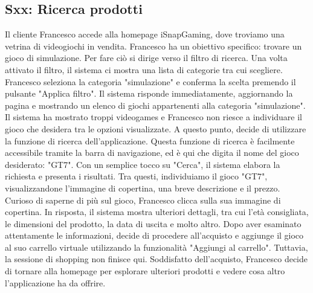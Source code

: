 \documentclass[12pt, a4paper, oneside]{book}
\begin{document}
    \subsection*{Sxx: Ricerca prodotti}

    Il cliente Francesco accede alla homepage iSnapGaming, dove troviamo una vetrina di videogiochi in vendita.
    Francesco ha un obiettivo specifico: trovare un gioco di simulazione. Per fare ciò si dirige verso il filtro di
    ricerca. Una volta attivato il filtro, il sistema ci mostra una lista di categorie tra cui scegliere. Francesco
    seleziona la categoria "simulazione" e conferma la scelta premendo il pulsante "Applica filtro". Il sistema risponde
    immediatamente, aggiornando la pagina e mostrando un elenco di giochi appartenenti alla categoria "simulazione".
    Il sistema ha mostrato troppi videogames e Francesco non riesce a individuare il gioco che desidera tra le opzioni
    visualizzate. A questo punto, decide di utilizzare la funzione di ricerca dell'applicazione. Questa funzione di
    ricerca è facilmente accessibile tramite la barra di navigazione, ed è qui che digita il nome del gioco
    desiderato: "GT7". Con un semplice tocco su "Cerca", il sistema elabora la richiesta e presenta i risultati.
    Tra questi, individuiamo il gioco "GT7", visualizzandone l'immagine di copertina, una breve descrizione e il prezzo.
    Curioso di saperne di più sul gioco, Francesco clicca sulla sua immagine di copertina. In risposta, il sistema
    mostra ulteriori dettagli, tra cui l'età consigliata, le dimensioni del prodotto, la data di uscita e molto altro.
    Dopo aver esaminato attentamente le informazioni, decide di procedere all'acquisto e aggiunge il gioco al suo
    carrello virtuale utilizzando la funzionalità  "Aggiungi al carrello". Tuttavia, la sessione di shopping non finisce
    qui. Soddisfatto dell'acquisto, Francesco decide di tornare alla homepage per esplorare ulteriori prodotti e vedere
    cosa altro l'applicazione ha da offrire.
\end{document}
